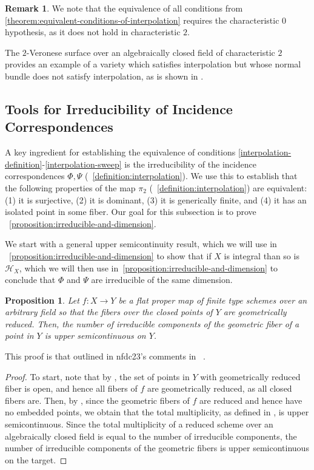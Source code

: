 \documentclass[reqno, 11pt]{amsart}
\theoremstyle{definition}
\theoremstyle{remark}
\numberwithin{equation}{section}
\numberwithin{thm}{section}
\numberwithin{prop}{section}
\numberwithin{lem}{section}
\numberwithin{cor}{section}
\numberwithin{conj}{section}
\numberwithin{defn}{section}
\theoremstyle{plain}
\newtheorem{proposition}[theorem]{Proposition}
\theoremstyle{definition}
\newtheorem{remark}[theorem]{Remark}
\newcommand\ssec{\subsection}
\newcommand\sch{\mathscr H}
\newcommand \ra{\rightarrow}
\newcommand \hilb[1]{\sch_{#1}}
\begin{document}
\begin{remark}
	\label{remark:}
	We note that the equivalence of all conditions from
	\autoref{theorem:equivalent-conditions-of-interpolation}
	requires the characteristic $0$ hypothesis, as it does not hold in characteristic $2$.

	The $2$-Veronese surface
	over an algebraically closed field of characteristic $2$ provides
	an example of a variety which satisfies interpolation but whose normal
	bundle does not satisfy interpolation, as is shown in \cite[Corollary 7.2.9]{landesman:undergraduate-thesis}. 
\end{remark}



\ssec{Tools for Irreducibility of Incidence Correspondences}
\label{ssec:tools-irreducibility}

A key ingredient for establishing the equivalence of conditions
\ref{interpolation-definition}-\ref{interpolation-sweep}
is the irreducibility of the incidence correspondences $\Phi, \Psi$ 
(~\autoref{definition:interpolation}).
We use this to establish that the following properties of the map
$\pi_2$ (~\autoref{definition:interpolation}) are equivalent:
(1) it is surjective, (2) it is dominant, (3) it is generically finite, 
and (4) it has an isolated point
in some fiber.
Our goal for this subsection is to prove
~\autoref{proposition:irreducible-and-dimension}.

We start with a general upper semicontinuity result, which we will use in 
~\autoref{proposition:irreducible-and-dimension}
to show that if $X$ is integral than so is $\hilb X$, which we will then use in~\autoref{proposition:irreducible-and-dimension}
to conclude that $\Phi$ and $\Psi$ are irreducible of the same dimension.
\begin{proposition}
	\label{proposition:upper-semicontinuous-number-of-components}
	Let $f: X \ra Y$ be a flat proper map of finite type schemes over an arbitrary field
	so that the fibers over the closed points of $Y$ are geometrically reduced. Then, the number of irreducible components of the geometric fiber of a point in $Y$
	is upper semicontinuous on $Y$.
\end{proposition}
This proof is that outlined in nfdc23's comments in ~\cite{MO:why-is-the-number-of-irreducible-components-upper-semicontinuous-in-nice-situations}.
\begin{proof}
	To start, note that by \cite[Th\'eor\`eme 12.2.4(v)]{EGAIV.3}, the set of points in $Y$ with geometrically reduced
fiber is open, and hence all fibers of $f$ are geometrically reduced, as all closed fibers are.
Then, by \cite[Th\'eor\`eme 12.2.4(ix)]{EGAIV.3}, since the geometric fibers of $f$ 
are reduced and hence have no embedded points, we obtain that the total multiplicity,
as defined in \cite[D\'efinition 4.7.4]{EGAIV.2}, is upper semicontinuous.
Since the total multiplicity of a reduced scheme over an algebraically closed field is equal to the number of irreducible
components,
the number of irreducible components of the geometric fibers is upper semicontinuous on the target.
\end{proof}
\end{document}
